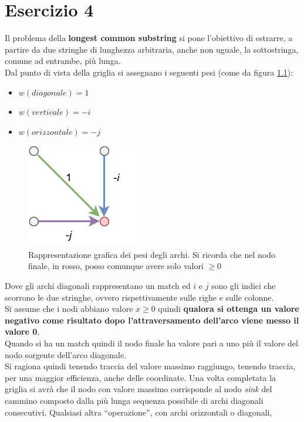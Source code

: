 \documentclass[a4paper,12pt, oneside]{book}
\begin{document}
\chapter{Esercizio 4}
Il problema della \textbf{longest common substring} si pone l'obiettivo di
estrarre, a partire da due stringhe di lunghezza arbitraria, anche non uguale,
la sottostringa, comune ad entrambe, più lunga.\\
Dal punto di vista della griglia si assegnano i seguenti pesi (come da figura
\ref{fig:pes4}): 
\begin{itemize}
  \item $w(diagonale)=1$
  \item $w(verticale)=-i$
  \item $w(orizzontale)=-j$
\end{itemize}
\begin{figure}
  \centering
  \includegraphics[scale = 1.3]{img/es41.pdf}
  \caption{Rappresentazione grafica dei pesi degli archi. Si ricorda che nel
    nodo finale, in rosso,
    posso comunque avere solo valori $\geq 0$}
  \label{fig:pes4}
\end{figure}
Dove gli archi diagonali rappresentano un match ed $i$ e $j$ sono gli indici che
scorrono le due stringhe, ovvero rispettivamente sulle righe e sulle colonne.\\
Si assume che i nodi abbiano valore $x\geq 0$ quindi
\textbf{qualora si ottenga un valore negativo come risultato dopo
  l'attraversamento dell'arco viene messo il valore 0}.\\
Quando si ha un match quindi il nodo finale ha valore pari a uno più il valore
del nodo sorgente dell'arco diagonale.\\
Si ragiona quindi tenendo traccia del valore massimo raggiungo, tenendo traccia,
per una maggior efficienza, anche delle coordinate. Una volta completata la
griglia si avrà che il nodo con valore massimo corrisponde al nodo \textit{sink}
del cammino composto dalla più lunga sequenza possibile di archi diagonali
consecutivi. Qualsiasi altra ``operazione'', con archi orizzontali o diagonali,
\end{document}

